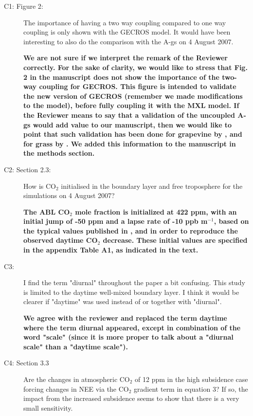 \documentclass[10pt,a4paper,notitlepage,twoside]{article}
\begin{document}
\begin{description}
\item[C1: Figure 2:] The importance of having a two way coupling compared to one way coupling is only
shown with the GECROS model. It would have been interesting to also do the comparison
with the A-gs on 4 August 2007.

\textbf{We are not sure if we interpret the remark of the Reviewer correctly. For the sake of clarity, we would like to stress that Fig. 2 in the manuscript does not show the importance of the two-way coupling for GECROS. This figure is intended to validate the new version of GECROS (remember we made modifications to the model), before fully coupling it with the MXL model. If the Reviewer means to say that a validation of the uncoupled A-gs would add value to our manuscript, then we would like to point that such validation has been done for grapevine by \citet{Jacobs:1996}, and for grass by \citet{Ronda:2001}. We added this information to the manuscript in the methods section.}

\item[C2: Section 2.3:] How is CO$_2$ initialised in the boundary layer and free troposphere for the
simulations on 4 August 2007?

\textbf{The ABL CO$_2$ mole fraction is initialized at 422 ppm, with an initial jump of -50 ppm and a lapse rate of -10 ppb m$^{-1}$, based on the typical values published in \citet{CassoTorralba:2008}, and in order to reproduce the observed daytime CO$_2$ decrease. These initial values are specified in the appendix Table A1, as indicated in the text.}

\item[C3:] I find the term "diurnal" throughout the paper a bit confusing. This study is limited to
the daytime well-mixed boundary layer. I think it would be clearer if "daytime" was used
instead of or together with "diurnal".

\textbf{We agree with the reviewer and replaced the term daytime where the term diurnal appeared, except in combination of the word "scale" (since it is more proper to talk about a "diurnal scale" than a "daytime scale").}

\item[C4: Section 3.3] Are the changes in atmospheric CO$_2$ of 12 ppm in the high subsidence case
forcing changes in NEE via the CO$_2$ gradient term in equation 3? If so, the impact from
the increased subsidence seems to show that there is a very small sensitivity.


\end{description}
\end{document}
